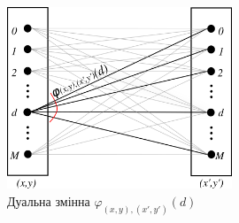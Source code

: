 \begin{figure}[h]
  \centering
  \includegraphics[width=0.6\textwidth]{images/phi_block}
  \caption{Дуальна змінна $\varphi_{\left(x, y \right), \left(x', y' \right)} \left(d \right)$}
  \label{fig:phi:block}
\end{figure}

